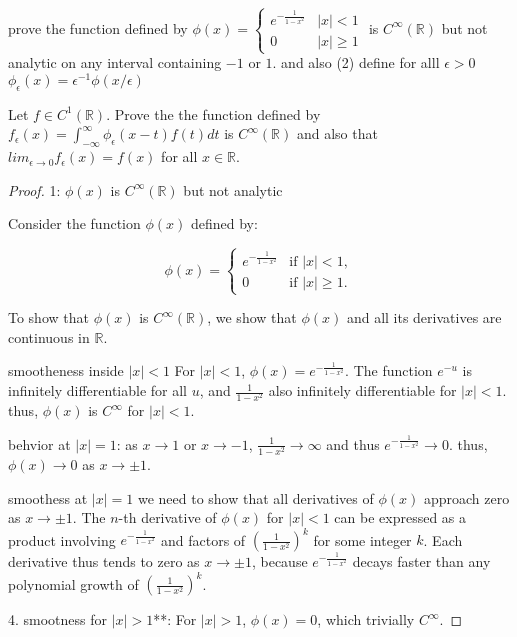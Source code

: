 \documentclass{article}
\begin{document}
prove the function defined by $\phi(x) = \begin{cases} e^{-\frac{1}{1-x^2}} & |x| < 1 \\ 0 & |x| \geq 1 \end{cases}$ is $C^{\infty}(\mathbb{R})$ but not analytic on any interval containing $-1$ or $1$.
and also (2) define for alll $\epsilon > 0$  $\phi_{\epsilon}(x) = \epsilon^{-1}\phi(x/\epsilon)$ 

Let $f\in C^1(\mathbb{R})$. Prove the the function defined by $f_{\epsilon}(x) = \int_{-\infty}^{\infty} \phi_{\epsilon}(x - t)f(t)dt$ is $C^{\infty}(\mathbb{R})$ and also that $lim_{\epsilon \to 0} f_{\epsilon}(x) = f(x)$ for all $x \in \mathbb{R}$.
\begin{proof}

   1: $\phi(x)$ is $C^{\infty}(\mathbb{R})$ but not analytic

Consider the function \(\phi(x)\) defined by:

\[
\phi(x) = 
\begin{cases} 
e^{-\frac{1}{1-x^2}} & \text{if } |x| < 1, \\
0 & \text{if } |x| \geq 1.
\end{cases}
\]

To show that \(\phi(x)\) is \(C^{\infty}(\mathbb{R})\), we show that \(\phi(x)\) and all its derivatives are continuous in \(\mathbb{R}\).

smootheness inside \(|x| < 1\) For \(|x| < 1\), \(\phi(x) = e^{-\frac{1}{1-x^2}}\). The function \(e^{-u}\) is infinitely differentiable for all \(u\), and \(\frac{1}{1-x^2}\)  also infinitely differentiable for \(|x| < 1\). thus, \(\phi(x)\) is \(C^{\infty}\) for \(|x| < 1\).

behvior at \(|x| = 1\): as \(x \to 1\) or \(x \to -1\), \(\frac{1}{1-x^2} \to \infty\) and thus \(e^{-\frac{1}{1-x^2}} \to 0\). thus, \(\phi(x) \to 0\) as \(x \to \pm 1\).

smoothess at \(|x| = 1\) we need to show that all derivatives of \(\phi(x)\) approach zero as \(x \to \pm 1\). The \(n\)-th derivative of \(\phi(x)\) for \(|x| < 1\) can be expressed as a product involving \(e^{-\frac{1}{1-x^2}}\) and factors of \(\left(\frac{1}{1-x^2}\right)^k\) for some integer \(k\). Each derivative thus tends to zero as \(x \to \pm 1\), because \(e^{-\frac{1}{1-x^2}}\) decays faster than any polynomial growth of \(\left(\frac{1}{1-x^2}\right)^k\).

4. smootness for \(|x| > 1\)**: For \(|x| > 1\), \(\phi(x) = 0\), which  trivially \(C^{\infty}\).


\end{proof}
\end{document}
